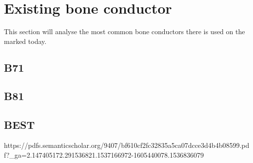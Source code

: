 \section{Existing bone conductor}
This section will analyse the most common bone conductors there is used on the marked today. 

\subsection{B71}

\subsection{B81}

\subsection{BEST}

https://pdfs.semanticscholar.org/9407/bf610cf2fc32835a5ca07dcce3d4b4b08599.pdf?_ga=2.147405172.291536821.1537166972-1605440078.1536836079